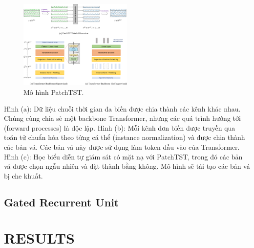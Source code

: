 \documentclass{ieeeojies}
\begin{document}
\begin{figure}[h]
    \centering
    \includegraphics[width=0.5\textwidth]{bibliography/modelPatchTST.png}
    \caption{Mô hình PatchTST.}
\end{figure}
Hình (a): Dữ liệu chuỗi thời gian đa biến được chia thành các kênh khác nhau. Chúng cùng chia sẻ một backbone Transformer, nhưng các quá trình hướng tới (forward processes) là độc lập.
Hình (b): Mỗi kênh đơn biến được truyền qua toán tử chuẩn hóa theo từng cá thể (instance normalization) và được chia thành các bản vá. Các bản vá này được sử dụng làm token đầu vào của Transformer.
Hình (c): Học biểu diễn tự giám sát có mặt nạ với PatchTST, trong đó các bản vá được chọn ngẫu nhiên và đặt thành bằng không. Mô hình sẽ tái tạo các bản vá bị che khuất.

\subsection{Gated Recurrent Unit}

\section{RESULTS}
\end{document}
